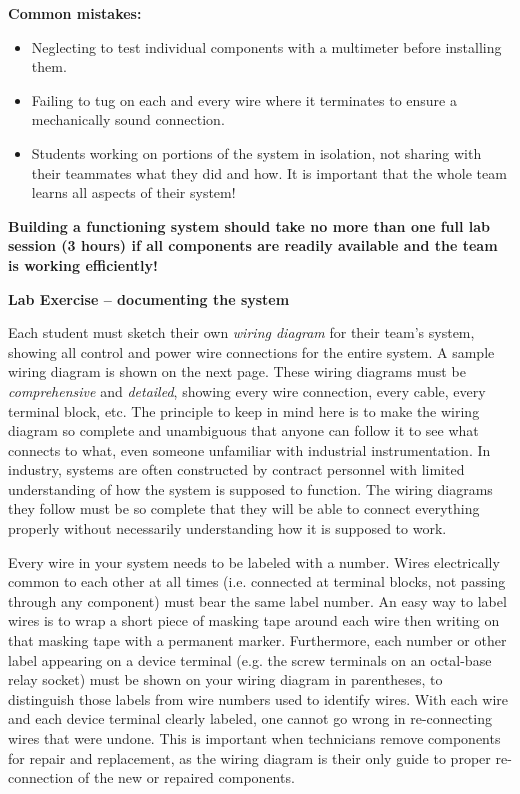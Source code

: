 \vskip 10pt

{\bf Common mistakes:}

\begin{itemize}
\item{} Neglecting to test individual components with a multimeter before installing them.
\item{} Failing to tug on each and every wire where it terminates to ensure a mechanically sound connection.
\item{} Students working on portions of the system in isolation, not sharing with their teammates what they did and how.  It is important that the whole team learns all aspects of their system!
\end{itemize}

\vskip 10pt

{\bf Building a functioning system should take no more than one full lab session (3 hours) if all components are readily available and the team is working efficiently!}





\vfil \eject

\noindent
{\bf Lab Exercise -- documenting the system}

\vskip 5pt

Each student must sketch their own {\it wiring diagram} for their team's system, showing all control and power wire connections for the entire system.  A sample wiring diagram is shown on the next page.  These wiring diagrams must be {\it comprehensive} and {\it detailed}, showing every wire connection, every cable, every terminal block, etc.  The principle to keep in mind here is to make the wiring diagram so complete and unambiguous that anyone can follow it to see what connects to what, even someone unfamiliar with industrial instrumentation.  In industry, systems are often constructed by contract personnel with limited understanding of how the system is supposed to function.  The wiring diagrams they follow must be so complete that they will be able to connect everything properly without necessarily understanding how it is supposed to work.

Every wire in your system needs to be labeled with a number.  Wires electrically common to each other at all times (i.e. connected at terminal blocks, not passing through any component) must bear the same label number.  An easy way to label wires is to wrap a short piece of masking tape around each wire then writing on that masking tape with a permanent marker.  Furthermore, each number or other label appearing on a device terminal (e.g. the screw terminals on an octal-base relay socket) must be shown on your wiring diagram in parentheses, to distinguish those labels from wire numbers used to identify wires.  With each wire and each device terminal clearly labeled, one cannot go wrong in re-connecting wires that were undone.  This is important when technicians remove components for repair and replacement, as the wiring diagram is their only guide to proper re-connection of the new or repaired components.

